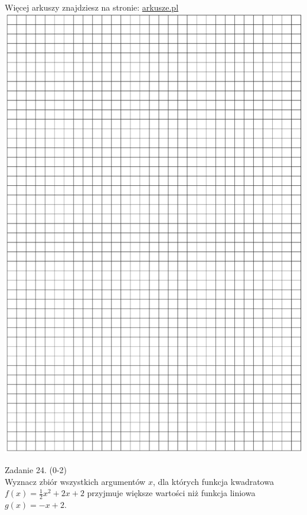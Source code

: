 \documentclass[10pt]{article}
\begin{document}
Więcej arkuszy znajdziesz na stronie: \href{http://arkusze.pl}{arkusze.pl}\\
\includegraphics[max width=\textwidth, center]{2024_11_21_72158d4a4efa7dd894bcg-11}

Zadanie 24. (0-2)\\
Wyznacz zbiór wszystkich argumentów \(x\), dla których funkcja kwadratowa \(f(x)=\frac{1}{2} x^{2}+2 x+2\) przyjmuje większe wartości niż funkcja liniowa \(g(x)=-x+2\).
\end{document}
